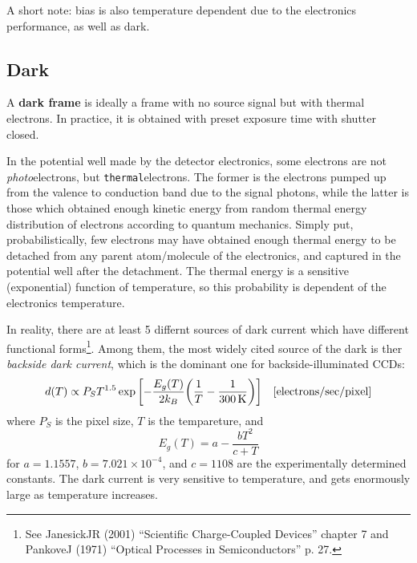 A short note: bias is also temperature dependent due to the electronics performance, as well as dark.

\subsection{Dark} \label{ss: calib-dark}

\begin{defn}[Dark]
A \textbf{dark frame} is ideally a frame with no source signal but with thermal electrons. In practice, it is obtained with preset exposure time with shutter closed.
\end{defn}

In the potential well made by the detector electronics, some electrons are not \emph{photo}electrons, but \texttt{thermal}electrons. The former is the electrons pumped up from the valence to conduction band due to the signal photons, while the latter is those which obtained enough kinetic energy from random thermal energy distribution of electrons according to quantum mechanics. Simply put, probabilistically, few electrons may have obtained enough thermal energy to be detached from any parent atom/molecule of the electronics, and captured in the potential well after the detachment. The thermal energy is a sensitive (exponential) function of temperature, so this probability is dependent of the electronics temperature. 

In reality, there are at least 5 differnt sources of dark current which have different functional forms\footnote{See JanesickJR (2001) ``Scientific Charge-Coupled Devices'' chapter 7 and PankoveJ (1971) ``Optical Processes in Semiconductors'' p. 27.}. Among them, the most widely cited source of the dark is ther \emph{backside dark current}, which is the dominant one for backside-illuminated CCDs:
\begin{equation}\label{eq: dark current}
  d(T) \propto 
    P_S T^{1.5} 
    \exp \qty[- \frac{E_g(T)}{2k_B} 
      \qty(\frac{1}{T} - \frac{1}{300 \,\mathrm{K}}) ]
    \quad [\mathrm{electrons/sec/pixel}]
\end{equation}
where $ P_S $ is the pixel size, $ T $ is the tempareture, and 
\begin{equation}
  E_g(T) = a - \frac{b T^2}{c + T}
\end{equation}
for $ a = 1.1557 $, $ b = 7.021 \times 10^{-4} $, and $ c = 1108 $ are the experimentally determined constants. The dark current is very sensitive to temperature, and gets enormously large as temperature increases.


